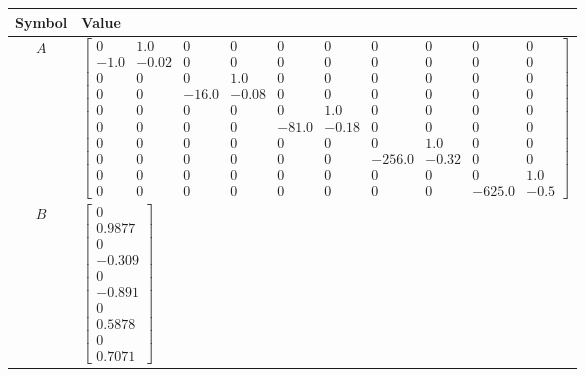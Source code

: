 \begin{tabular}{cl}
\hline
  Symbol  & Value                                                                                                                                                                                                                                                                                                                                                                                                                                                                                           \\
\hline
   $A$    & $\left[\begin{matrix}0 & 1.0 & 0 & 0 & 0 & 0 & 0 & 0 & 0 & 0\\-1.0 & -0.02 & 0 & 0 & 0 & 0 & 0 & 0 & 0 & 0\\0 & 0 & 0 & 1.0 & 0 & 0 & 0 & 0 & 0 & 0\\0 & 0 & -16.0 & -0.08 & 0 & 0 & 0 & 0 & 0 & 0\\0 & 0 & 0 & 0 & 0 & 1.0 & 0 & 0 & 0 & 0\\0 & 0 & 0 & 0 & -81.0 & -0.18 & 0 & 0 & 0 & 0\\0 & 0 & 0 & 0 & 0 & 0 & 0 & 1.0 & 0 & 0\\0 & 0 & 0 & 0 & 0 & 0 & -256.0 & -0.32 & 0 & 0\\0 & 0 & 0 & 0 & 0 & 0 & 0 & 0 & 0 & 1.0\\0 & 0 & 0 & 0 & 0 & 0 & 0 & 0 & -625.0 & -0.5\end{matrix}\right]$ \\
   $B$    & $\left[\begin{matrix}0\\0.9877\\0\\-0.309\\0\\-0.891\\0\\0.5878\\0\\0.7071\end{matrix}\right]$                                                                                                                                                                                                                                                                                                                                                                                                  \\

\end{tabular}
